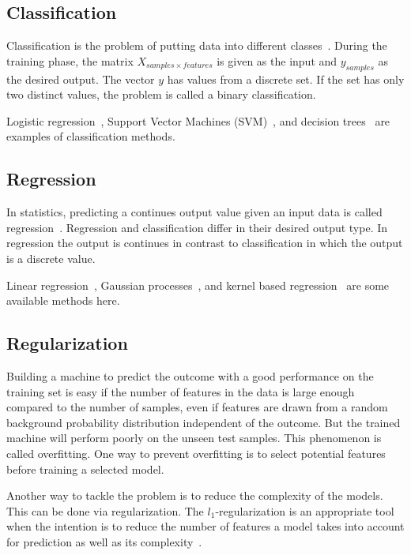 \subsection{Classification}
Classification is the problem of putting data into different classes~\cite{statistical-learning}. During the training phase, the matrix $X_{samples \times features}$ is given as the input and $y_{samples}$ as the desired output. The vector $y$ has values from a discrete set. If the set has only two distinct values, the problem is called a binary classification.

Logistic regression~\cite{logistic-regression1,logistic-regression2}, Support Vector Machines (SVM)~\cite{svm1,svm2}, and decision trees~\cite[TODO:chapter]{statistical-learning} are examples of classification methods.

\subsection{Regression}
In statistics, predicting a continues output value given an input data is called regression~\cite[TODO:chapter]{statistical-learning}. Regression and classification differ in their desired output type. In regression the output is continues in contrast to classification in which the output is a discrete value.

Linear regression~\cite[TODO:chapter]{statistical-learning}, Gaussian processes~\cite{gaussian-processes}, and kernel based regression~\cite[TODO:chapter]{learning-with-kernels} are some available methods here.

\subsection{Regularization}
Building a machine to predict the outcome with a good performance on the training set is easy if the number of features in the data is large enough compared to the number of samples, even if features are drawn from a random background probability distribution independent of the outcome. But the trained machine will perform poorly on the unseen test samples. This phenomenon is called overfitting. One way to prevent overfitting is to select potential features before training a selected model.

Another way to tackle the problem is to reduce the complexity of the models. This can be done via regularization. The $l_1$-regularization is an appropriate tool when the intention is to reduce the number of features a model takes into account for prediction as well as its complexity~\cite{l1-regularized}.


